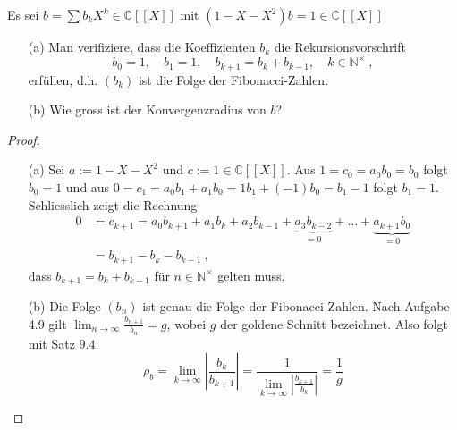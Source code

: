 \setcounter{aufgabe}{9}
\begin{aufgabe}
	Es sei $b = \sum b_k X^k \in \mathbb C [\![ X ]\!]$ mit 
	$(1-X-X^2)b = 1 \in \mathbb C [\![ X ]\!]$
	\begin{enumerate}
		\item[(a)] Man verifiziere, dass die Koeffizienten $b_k$ die Rekursionsvorschrift
			\[
				b_0 = 1, \quad b_1 = 1, \quad b_{k+1} = b_k + b_{k-1}, \quad k \in \mathbb N^\times \ ,
			\]
			erfüllen, d.h. $(b_k)$ ist die Folge der Fibonacci-Zahlen.
		\item[(b)] Wie gross ist der Konvergenzradius von $b$?
	\end{enumerate}
\end{aufgabe}
\begin{proof}
	\begin{enumerate}
		\item[(a)] Sei $a := 1 - X - X^2$ und $c := 1 \in \mathbb C [\![ X ]\!]$. Aus 
			$1 = c_0 = a_0 b_0 = b_0$ folgt $b_0 = 1$ und aus 
			$0 = c_1 = a_0 b_1 + a_1 b_0 = 1 b_1 + (-1) b_0 = b_1 - 1$ folgt $b_1 = 1$.
			Schliesslich zeigt die Rechnung
			\begin{align*}
				0 &= c_{k+1} = a_0 b_{k+1} + a_1 b_k + a_2 b_{k-1} + \underbrace{a_3 b_{k-2}}_{=0} + 
				\ldots + \underbrace{ a_{k+1} b_0 }_{=0} \\
					&= b_{k+1} - b_k - b_{k-1} \ ,
			\end{align*}
			dass $b_{k+1} = b_k + b_{k-1}$ für $n \in \mathbb N^\times$ gelten muss.
		\item[(b)] Die Folge $(b_n)$ ist genau die Folge der Fibonacci-Zahlen. Nach Aufgabe
			4.9 gilt $\lim_{n \to \infty} \frac{b_{n+1}}{b_n} = g$, wobei $g$ der goldene Schnitt
			bezeichnet. Also folgt mit Satz $9.4$:
			\[
				\rho_b = \lim_{k\to \infty} \left| \frac{b_k}{b_{k+1}} \right|
					= \frac{1}{\displaystyle \lim_{k\to \infty} \left| \frac{b_{k+1}}{b_k}\right|} = \frac 1 g
			\]
	\end{enumerate}
\end{proof}
